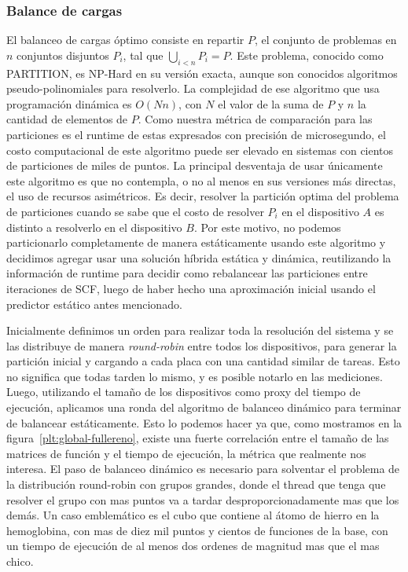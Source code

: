 \subsubsection{Balance de cargas}
El balanceo de cargas \'optimo consiste en repartir $P$, el conjunto de problemas en
$n$ conjuntos disjuntos $P_i$, tal que $\bigcup_{i<n} P_i = P$. Este problema, conocido como PARTITION,
es NP-Hard en su versi\'on exacta, aunque son conocidos algoritmos pseudo-polinomiales para resolverlo.
La complejidad de ese algoritmo que usa programaci\'on din\'amica es $O(Nn)$, con $N$ el valor
de la suma de $P$ y $n$ la cantidad de elementos de $P$. Como nuestra m\'etrica de comparaci\'on para las
particiones es el runtime de estas expresados con precisi\'on de microsegundo, el costo computacional
de este algoritmo puede ser elevado en sistemas con cientos de particiones de miles de puntos.
La principal desventaja de usar \'unicamente este algoritmo es que no contempla, o no al menos
en sus versiones m\'as directas, el uso de recursos asim\'etricos. Es decir, resolver la partici\'on
optima del problema de particiones cuando se sabe que el costo de resolver $P_i$ en el dispositivo
$A$ es distinto a resolverlo en el dispositivo $B$. Por este motivo, no podemos particionarlo completamente
de manera est\'aticamente
usando este algoritmo y decidimos agregar usar una soluci\'on h\'ibrida est\'atica y din\'amica, reutilizando
la informaci\'on de runtime para decidir como rebalancear las particiones entre iteraciones de SCF, luego
de haber hecho una aproximaci\'on inicial usando el predictor est\'atico antes mencionado.

Inicialmente definimos un orden para realizar toda la resoluci\'on del sistema y
se las distribuye de manera \textit{round-robin} entre todos los dispositivos, para generar la
partici\'on inicial y cargando a cada placa con una cantidad similar de tareas. Esto no significa
que todas tarden lo mismo, y es posible notarlo en las mediciones. Luego, utilizando el tama\~no
de los dispositivos como proxy del tiempo de ejecuci\'on, aplicamos una ronda del algoritmo de balanceo din\'amico
para terminar de balancear est\'aticamente. Esto lo podemos hacer ya que, como mostramos en la figura~\ref{plt:global-fullereno},
existe una fuerte correlaci\'on entre el tama\~no de las matrices de funci\'on y el tiempo de ejecuci\'on, la m\'etrica que realmente
nos interesa. El paso de balanceo din\'amico es necesario para solventar el problema de la distribuci\'on
round-robin con grupos grandes, donde el thread que tenga que resolver el grupo con mas puntos va a tardar
desproporcionadamente mas que los dem\'as. Un caso emblem\'atico es el cubo que contiene al \'atomo de hierro en la hemoglobina,
con mas de diez mil puntos y cientos de funciones de la base, con un tiempo de ejecuci\'on de al menos
dos ordenes de magnitud mas que el mas chico.

